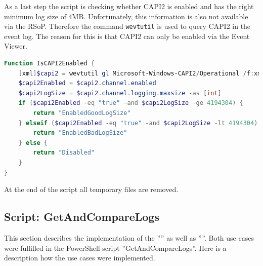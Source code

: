 As a last step the script is checking whether CAPI2 is enabled and has the right minimum log size of 4MB. Unfortunately, this information is also not available via the RSoP. Therefore the command \lstinline|wevtutil| is used to query CAPI2 in the event log. The reason for this is that CAPI2 can only be enabled via the Event Viewer. \cite{CAPI2} 
\begin{lstlisting}[caption=Function IsCAPI2Enabled, language=PowerShell]
Function IsCAPI2Enabled {
    [xml]$capi2 = wevtutil gl Microsoft-Windows-CAPI2/Operational /f:xml
    $capi2Enabled = $capi2.channel.enabled
    $capi2LogSize = $capi2.channel.logging.maxsize -as [int]
    if ($capi2Enabled -eq "true" -and $capi2LogSize -ge 4194304) {
        return "EnabledGoodLogSize"
    } elseif ($capi2Enabled -eq "true" -and $capi2LogSize -lt 4194304) {
        return "EnabledBadLogSize"
    } else {
        return "Disabled"
    }
}    
\end{lstlisting}
At the end of the script all temporary files are removed.
\clearpage

\subsection{Script: GetAndCompareLogs}
This section describes the implementation of the '''' as well as ''''. Both use cases were fulfilled in the PowerShell script ''GetAndCompareLogs''. Here is a description how the use cases were implemented.

